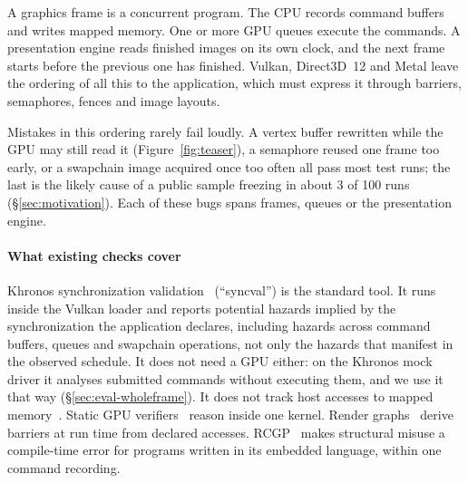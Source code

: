\documentclass[acmtog,anonymous,review]{acmart}
\newcommand{\rcgp}{RCGP\xspace}
\begin{document}
A graphics frame is a concurrent program. The CPU records command buffers and writes mapped memory. One or more GPU
queues execute the commands. A presentation engine reads finished images on its own clock, and the next frame starts
before the previous one has finished. Vulkan, Direct3D~12 and Metal leave the ordering of all this to the
application, which must express it through barriers, semaphores, fences and image layouts.

Mistakes in this ordering rarely fail loudly. A vertex buffer rewritten while the GPU may still read it
(Figure~\ref{fig:teaser}), a semaphore reused one frame too early, or a swapchain image acquired once too often all
pass most test runs; the last is the likely cause of a public sample freezing in about 3 of 100 runs
(\S\ref{sec:motivation}). Each of these bugs spans frames, queues or the presentation engine.

\paragraph{What existing checks cover}
Khronos synchronization validation~\cite{lunarg2021syncval} (``syncval'') is the standard tool. It runs inside the
Vulkan loader and reports potential hazards implied by the synchronization the application declares, including
hazards across command buffers, queues and swapchain operations, not only the hazards that manifest in the observed
schedule. It does not need a GPU either: on the Khronos mock driver it analyses submitted commands without executing
them, and we use it that way (\S\ref{sec:eval-wholeframe}). It does not track host accesses to mapped
memory~\cite{lunarg2021syncval}. Static GPU
verifiers~\cite{betts2012gpuverify,cogumbreiro2021faial,martinez2026kuiper,bansal2026prism} reason inside one kernel.
Render graphs~\cite{odonnell2017framegraph,amd2022rps} derive barriers at run time from declared accesses.
\rcgp~\cite{sivaram2026rcgp} makes structural misuse a compile-time error for programs written in its embedded
language, within one command recording.
\end{document}
